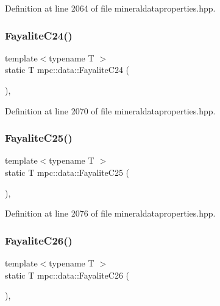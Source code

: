 Definition at line 2064 of file mineraldataproperties.\+hpp.

\mbox{\label{namespacempc_1_1data_ae447802f608f083ab7d671612baa819e}} 
\subsubsection{\texorpdfstring{Fayalite\+C24()}{FayaliteC24()}}
{\footnotesize\ttfamily template$<$typename T $>$ \\
static T mpc\+::data\+::\+Fayalite\+C24 (\begin{DoxyParamCaption}{ }\end{DoxyParamCaption})\hspace{0.3cm}{\ttfamily [inline]}, {\ttfamily [static]}}



Definition at line 2070 of file mineraldataproperties.\+hpp.

\mbox{\label{namespacempc_1_1data_a1bae114e3f2d4eb0fae81563079c941a}} 
\subsubsection{\texorpdfstring{Fayalite\+C25()}{FayaliteC25()}}
{\footnotesize\ttfamily template$<$typename T $>$ \\
static T mpc\+::data\+::\+Fayalite\+C25 (\begin{DoxyParamCaption}{ }\end{DoxyParamCaption})\hspace{0.3cm}{\ttfamily [inline]}, {\ttfamily [static]}}



Definition at line 2076 of file mineraldataproperties.\+hpp.

\mbox{\label{namespacempc_1_1data_ad467139e938bb2cdeadf6eeefbcd2b03}} 
\subsubsection{\texorpdfstring{Fayalite\+C26()}{FayaliteC26()}}
{\footnotesize\ttfamily template$<$typename T $>$ \\
static T mpc\+::data\+::\+Fayalite\+C26 (\begin{DoxyParamCaption}{ }\end{DoxyParamCaption})\hspace{0.3cm}{\ttfamily [inline]}, {\ttfamily [static]}}



